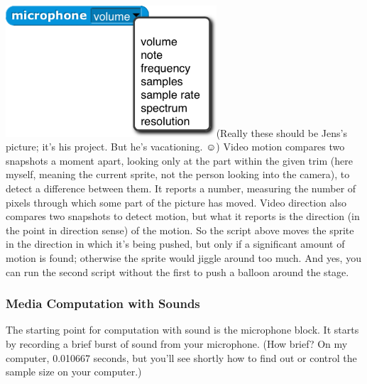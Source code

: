 \includegraphics[width=3.09028in,height=1.92361in]{media/image825.png}(Really
these should be Jens's picture; it's his project. But he's vacationing.
☺) Video motion compares two snapshots a moment apart, looking only at
the part within the given trim (here myself, meaning the current sprite,
not the person looking into the camera), to detect a difference between
them. It reports a number, measuring the number of pixels through which
some part of the picture has moved. Video direction also compares two
snapshots to detect motion, but what it reports is the direction (in the
point in direction sense) of the motion. So the script above moves the
sprite in the direction in which it's being pushed, but only if a
significant amount of motion is found; otherwise the sprite would jiggle
around too much. And yes, you can run the second script without the
first to push a balloon around the stage.

\subsubsection*{Media Computation with
Sounds}\label{media-computation-with-sounds}

The starting point for computation with sound is the microphone block.
It starts by recording a brief burst of sound from your microphone. (How
brief? On my computer, 0.010667 seconds, but you'll see shortly how to
ﬁnd out or control the sample size on your computer.)


